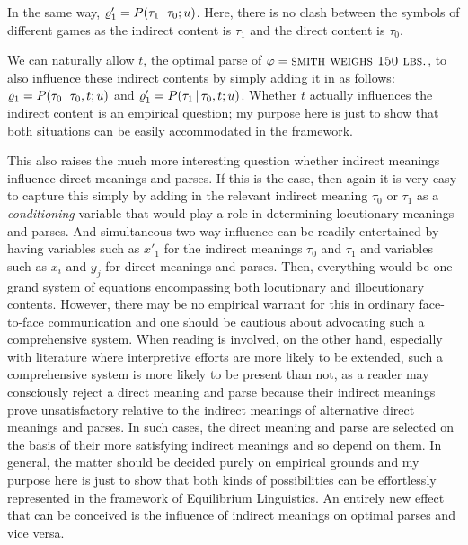 

In the same way, $\varrho'_1 = P(\tau_1 \,|\, \tau_0; u)$. Here, there is no clash between the symbols of different games as the indirect content is $\tau_1$ and the direct content is $\tau_0$.

We can naturally allow $t$, the optimal parse of $\varphi = \Expression{Smith weighs 150 lbs.}$, to also influence these indirect contents by simply adding it in as follows: $\varrho_1 = P(\tau_0 \,|\, \tau_0, t; u)$ and $\varrho'_1 = P(\tau_1 \,|\, \tau_0, t; u)$. Whether $t$ actually influences the indirect content is an empirical question; my purpose here is just to show that both situations can be easily accommodated in the framework.

This also raises the much more interesting question whether indirect meanings influence direct meanings and parses. If this is the case, then again it is very easy to capture this simply by adding in the relevant indirect meaning $\tau_0$ or $\tau_1$ as a \emph{conditioning} variable that would play a role in determining locutionary meanings and parses. And simultaneous two-way influence can be readily entertained by having variables such as $x'_1$ for the indirect meanings $\tau_0$ and $\tau_1$ and variables such as $x_i$ and $y_j$ for direct meanings and parses. Then, everything would be one grand system of equations encompassing both locutionary and illocutionary contents. However, there may be no empirical warrant for this in ordinary face-to-face communication and one should be cautious about advocating such a comprehensive system. When reading is involved, on the other hand, especially with literature where interpretive efforts are more likely to be extended, such a comprehensive system is more likely to be present than not, as a reader may consciously reject a direct meaning and parse because their indirect meanings prove unsatisfactory relative to the indirect meanings of alternative direct meanings and parses. In such cases, the direct meaning and parse are selected on the basis of their more satisfying indirect meanings and so depend on them. In general, the matter should be decided purely on empirical grounds and my purpose here is just to show that both kinds of possibilities can be effortlessly represented in the framework of Equilibrium Linguistics. An entirely new effect that can be conceived is the influence of indirect meanings on optimal parses and vice versa.

